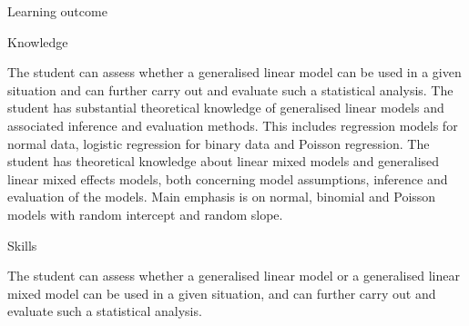 \documentclass[ignorenonframetext,]{beamer}
\begin{document}
\begin{frame}

\begin{block}{Learning outcome}

\begin{block}{Knowledge}

The student can assess whether a generalised linear model can be used in
a given situation and can further carry out and evaluate such a
statistical analysis. The student has substantial theoretical knowledge
of generalised linear models and associated inference and evaluation
methods. This includes regression models for normal data, logistic
regression for binary data and Poisson regression. The student has
theoretical knowledge about linear mixed models and generalised linear
mixed effects models, both concerning model assumptions, inference and
evaluation of the models. Main emphasis is on normal, binomial and
Poisson models with random intercept and random slope.

\end{block}

\begin{block}{Skills}

The student can assess whether a generalised linear model or a
generalised linear mixed model can be used in a given situation, and can
further carry out and evaluate such a statistical analysis.

\end{block}

\end{block}

\end{frame}
\end{document}
